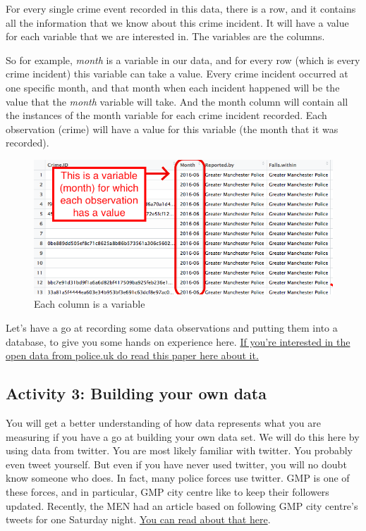 \documentclass[
]{book}
\begin{document}
For every single crime event recorded in this data, there is a row, and it contains all the information that we know about this crime incident. It will have a value for each variable that we are interested in. The variables are the columns.

So for example, \emph{month} is a variable in our data, and for every row (which is every crime incident) this variable can take a value. Every crime incident occurred at one specific month, and that month when each incident happened will be the value that the \emph{month} variable will take. And the month column will contain all the instances of the month variable for each crime incident recorded. Each observation (crime) will have a value for this variable (the month that it was recorded).

\begin{figure}
\centering
\includegraphics{imgs/columnIsVariable.png}
\caption{Each column is a variable}
\end{figure}

Let's have a go at recording some data observations and putting them into a database, to give you some hands on experience here. \href{http://www.tandfonline.com/doi/abs/10.1080/15230406.2014.972456}{If you're interested in the open data from police.uk do read this paper here about it.}

\hypertarget{activity-3-building-your-own-data}{%
\subsection{Activity 3: Building your own data}\label{activity-3-building-your-own-data}}

You will get a better understanding of how data represents what you are measuring if you have a go at building your own data set. We will do this here by using data from twitter. You are most likely familiar with twitter. You probably even tweet yourself. But even if you have never used twitter, you will no doubt know someone who does. In fact, many police forces use twitter. GMP is one of these forces, and in particular, GMP city centre like to keep their followers updated. Recently, the MEN had an article based on following GMP city centre's tweets for one Saturday night. \href{http://www.manchestereveningnews.co.uk/news/greater-manchester-news/what-police-city-centre-deal-13441129}{You can read about that here}.
\end{document}
